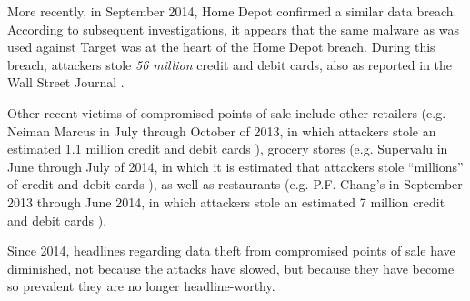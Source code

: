 More recently, in September 2014, Home Depot confirmed a similar data breach.
According to subsequent investigations, it appears that the same malware as was used against Target was at the heart of the Home Depot breach.
During this breach, attackers stole \emph{56 million} credit and debit cards, also as reported in the Wall Street Journal \cite{homedepothack}.

Other recent victims of compromised points of sale include other retailers
	(e.g. Neiman Marcus in July through October of 2013, in which attackers stole an estimated 1.1 million credit and debit cards \cite{neimanmarcushack}),
	grocery stores (e.g. Supervalu in June through July of 2014, in which it is estimated that attackers stole ``millions'' of credit and debit cards \cite{supervaluhack}),
	as well as restaurants (e.g. P.F. Chang's in September 2013 through June 2014, in which attackers stole an estimated 7 million credit and debit cards \cite{pfchanghack}).

Since 2014, headlines regarding data theft from compromised points of sale have diminished,
    not because the attacks have slowed, but because they have become so prevalent they are no longer headline-worthy.
